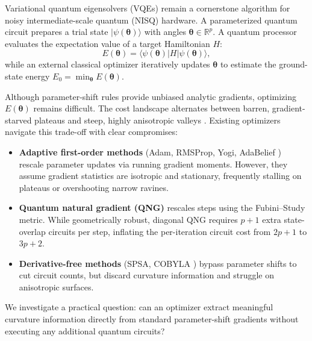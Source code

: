 \documentclass[11pt,a4paper]{article}
\begin{document}
Variational quantum eigensolvers (VQEs) \cite{peruzzo2014variational,mcclean2016theory} remain a cornerstone algorithm for noisy intermediate-scale quantum (NISQ) hardware. A parameterized quantum circuit prepares a trial state $|\psi(\boldsymbol{\theta})\rangle$ with angles $\boldsymbol{\theta} \in \mathbb{R}^p$. A quantum processor evaluates the expectation value of a target Hamiltonian $H$:
\begin{equation}
E(\boldsymbol{\theta}) = \langle \psi(\boldsymbol{\theta}) | H | \psi(\boldsymbol{\theta}) \rangle,
\label{eq:vqe_cost}
\end{equation}
while an external classical optimizer iteratively updates $\boldsymbol{\theta}$ to estimate the ground-state energy $E_0 = \min_{\boldsymbol{\theta}} E(\boldsymbol{\theta})$.

Although parameter-shift rules \cite{mitarai2018quantum,schuld2019evaluating} provide unbiased analytic gradients, optimizing $E(\boldsymbol{\theta})$ remains difficult. The cost landscape alternates between barren, gradient-starved plateaus and steep, highly anisotropic valleys \cite{mcclean2018barren,cerezo2021cost,wierichs2020avoiding}. Existing optimizers navigate this trade-off with clear compromises:
\begin{itemize}
    \item \textbf{Adaptive first-order methods} (Adam, RMSProp, Yogi, AdaBelief \cite{kingma2014adam,tieleman2012lecture,zaheer2018adaptive,zhuang2020adabelief}) rescale parameter updates via running gradient moments. However, they assume gradient statistics are isotropic and stationary, frequently stalling on plateaus or overshooting narrow ravines.
    \item \textbf{Quantum natural gradient (QNG)} \cite{stokes2020quantum,wierichs2020avoiding} rescales steps using the Fubini--Study metric. While geometrically robust, diagonal QNG requires $p+1$ extra state-overlap circuits per step, inflating the per-iteration circuit cost from $2p+1$ to $3p+2$.
    \item \textbf{Derivative-free methods} (SPSA, COBYLA \cite{spall1992multivariate,novak2025benchmarking}) bypass parameter shifts to cut circuit counts, but discard curvature information and struggle on anisotropic surfaces.
\end{itemize}

We investigate a practical question: can an optimizer extract meaningful curvature information directly from standard parameter-shift gradients without executing any additional quantum circuits?
\end{document}
